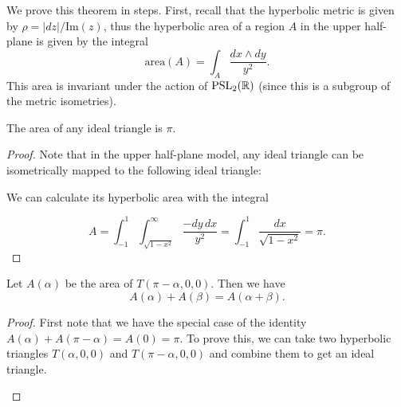 \documentclass{pset}
\begin{document}
\begin{solution}
  We prove this theorem in steps. First, recall that the hyperbolic metric is given by $\rho = |dz| / \textrm{Im}(z)$, thus the hyperbolic area of a region $A$ in the upper half-plane is given by the integral 
  \[
    \textrm{area}(A) = \int_A \frac{dx\wedge dy}{y^2}.
  \]
  This area is invariant under the action of $\textrm{PSL}_2(\mathbb{R})$ (since this is a subgroup of the metric isometries).

  \begin{claim}
    The area of any ideal triangle is $\pi$.
  \end{claim}
  \begin{proof}
    Note that in the upper half-plane model, any ideal triangle can be isometrically mapped to the following ideal triangle:
    \medskip
    \begin{center}
    \end{center}

    We can calculate its hyperbolic area with the integral

    \[
      A = \int_{-1}^1\int_{\sqrt{1-x^2}}^\infty \frac{-dy\, dx}{y^2} = \int_{-1}^1 \frac{dx}{\sqrt{1-x^2}} = \pi.
    \]
  \end{proof}

  \begin{claim}
    Let $A(\alpha)$ be the area of $T(\pi - \alpha, 0, 0)$. Then we have
    \[A(\alpha)+A(\beta) = A(\alpha + \beta).\]
  \end{claim}

  \begin{proof}
    First note that we have the special case of the identity $A(\alpha) + A(\pi - \alpha) = A(0)=\pi.$ To prove this, we can take two hyperbolic triangles $T(\alpha, 0, 0)$ and $T(\pi - \alpha, 0, 0)$ and combine them to get an ideal triangle.

    \medskip
    \begin{center}
\end{center}
\end{proof}
\end{solution}
\end{document}

